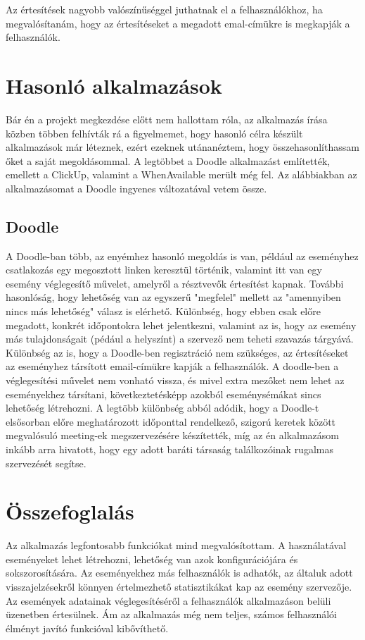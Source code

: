 \documentclass[a4paper,12pt]{report}
\theoremstyle{definition}
\theoremstyle{remark}
\begin{document}
Az értesítések nagyobb valószínűséggel juthatnak el a felhasználókhoz, ha megvalósítanám, hogy az értesítéseket a megadott emal-címükre is megkapják a felhasználók.

\chapter{Hasonló alkalmazások}

Bár én a projekt megkezdése előtt nem hallottam róla, az alkalmazás írása közben többen felhívták rá a figyelmemet, hogy hasonló célra készült alkalmazások már léteznek, ezért ezeknek utánanéztem, hogy összehasonlíthassam őket a saját megoldásommal. A legtöbbet a Doodle alkalmazást említették, emellett a ClickUp, valamint a WhenAvailable merült még fel. Az alábbiakban az alkalmazásomat a Doodle\cite{DoodleWebsite} ingyenes változatával vetem össze.

\section{Doodle}

A Doodle-ban több, az enyémhez hasonló megoldás is van, például az eseményhez csatlakozás egy megosztott linken keresztül történik, valamint itt van egy esemény véglegesítő művelet, amelyről a résztvevők értesítést kapnak.  További hasonlóság, hogy lehetőség van az egyszerű "megfelel" mellett az "amennyiben nincs más lehetőség" válasz is elérhető. Különbség, hogy ebben csak előre megadott, konkrét időpontokra lehet jelentkezni, valamint az is, hogy az esemény más tulajdonságait (pédául a helyszínt) a szervező nem teheti szavazás tárgyává. Különbség az is, hogy a Doodle-ben regisztráció nem szükséges, az értesítéseket az eseményhez társított email-címükre kapják a felhasználók. A doodle-ben a véglegesítési művelet nem vonható vissza, és mivel extra mezőket nem lehet az eseményekhez társítani, következtetésképp azokból eseménysémákat sincs lehetőség létrehozni. A legtöbb különbség abból adódik, hogy a Doodle-t elsősorban előre meghatározott időponttal rendelkező, szigorú keretek között megvalósuló meeting-ek megszervezésére készítették, míg az én alkalmazásom inkább arra hivatott, hogy egy adott baráti társaság találkozóinak rugalmas szervezését segítse.

\chapter{Összefoglalás}

Az alkalmazás legfontosabb funkciókat mind megvalósítottam. A használatával eseményeket lehet létrehozni, lehetőség van azok konfigurációjára és sokszorosítására. Az eseményekhez más felhasználók is adhatók, az általuk adott visszajelzésekről könnyen értelmezhető statisztikákat kap az esemény szervezője. Az események adatainak véglegesítéséről a felhasználók alkalmazáson belüli üzenetben értesülnek. Ám az alkalmazás még nem teljes, számos felhasználói élményt javító funkcióval kibővíthető.
\end{document}
